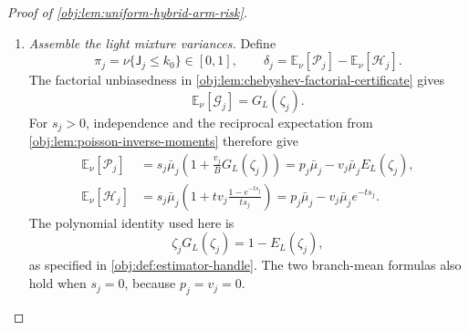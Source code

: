\begin{proof}[Proof of \cref{obj:lem:uniform-hybrid-arm-risk}]
\begin{enumerate}
For \(s_j\le B\), the following bounds retain each mixed monomial:
\[
\begin{aligned}
\frac{s_jv_j^2}{B^2}&\le\frac{p_j}{\epsilon},&
\frac{s_jv_j}{tB^2}&\le v_j,&
\frac{s_j^2v_j}{tB^2}&\le\frac{p_j}{t},\\
\frac{s_j^2v_j^2}{B^2}&\le p_j^2,&
s_j^2&\le p_j^2,&
p_j&\le\frac B\epsilon.
\end{aligned}
\]
When \(s_j>0\), the first follows from
\(s_jv_j^2/B^2\le v_j^2/s_j\le p_j/\epsilon\).
The second follows from \(s_j\le B\le tB^2\), since \(tB\ge1\).
The next two use \(s_j^2\le B^2\) and \(v_j\le p_j\).
When \(s_j=0\), all these inequalities follow from \(v_j=p_j=0\).

Expanding the product and using \(q_j\le s_j\) gives
\[
\begin{aligned}
&\left(\frac{q_j}{u}+q_j^2\right)
\left(1+\frac{v_j^2}{B^2}+\frac{v_j}{tB^2}\right)\\
&\quad\le
\frac{s_j}{u}
+\frac{s_jv_j^2}{uB^2}
+\frac{s_jv_j}{utB^2}
+s_j^2+\frac{s_j^2v_j^2}{B^2}
+\frac{s_j^2v_j}{tB^2}\\
&\quad\le
\frac{3p_j}{u\epsilon}+\frac{p_j}{t}+2p_j^2
\le
\frac{3p_j}{u\epsilon}+\frac{p_j}{t}
+\frac{2B^2}{\epsilon^2}.
\end{aligned}
\]
Here \(s_j,v_j\le p_j/\epsilon\) uses \(\epsilon\le1\).
Thus
\[
\operatorname{Var}_\nu(\mathcal P_j)
\le\mathbb E_\nu[\mathcal P_j^2]
\le
6F_{\mathrm{grow}}
\left(\frac{p_j}{u\epsilon}+\frac{p_j}{t}
+\frac{B^2}{\epsilon^2}\right).
\]
Summation yields
\[
\sum_{j\in\mathcal J_{\mathrm{light}}}
\operatorname{Var}_\nu(\mathcal P_j)
\le
6F_{\mathrm{grow}}
\left(
\frac{M_{\mathrm{light}}}{u\epsilon}
+\frac{M_{\mathrm{light}}}{t}
+\frac{c_{\mathrm{light}}B^2}{\epsilon^2}
\right).
\]

\item \textit{Assemble the light mixture variances.}
Define
\[
\pi_j=\nu\{\mathsf J_j\le k_0\}\in[0,1],
\qquad
\delta_j=\mathbb E_\nu[\mathcal P_j]
-\mathbb E_\nu[\mathcal H_j].
\]
The factorial unbiasedness in
\cref{obj:lem:chebyshev-factorial-certificate} gives
\[
\mathbb E_\nu[\mathcal G_j]=G_L(\zeta_j).
\]
For \(s_j>0\), independence and the reciprocal expectation from
\cref{obj:lem:poisson-inverse-moments} therefore give
\[
\begin{aligned}
\mathbb E_\nu[\mathcal P_j]
&=s_j\bar\mu_j
\left(1+\frac{v_j}{B}G_L(\zeta_j)\right)
=p_j\bar\mu_j-v_j\bar\mu_jE_L(\zeta_j),\\
\mathbb E_\nu[\mathcal H_j]
&=s_j\bar\mu_j
\left(1+tv_j\frac{1-e^{-ts_j}}{ts_j}\right)
=p_j\bar\mu_j-v_j\bar\mu_je^{-ts_j}.
\end{aligned}
\]
The polynomial identity used here is
\[
\zeta_jG_L(\zeta_j)=1-E_L(\zeta_j),
\]
as specified in \cref{obj:def:estimator-handle}. The two branch-mean formulas also hold when \(s_j=0\), because \(p_j=v_j=0\).


\end{enumerate}
\end{proof}
